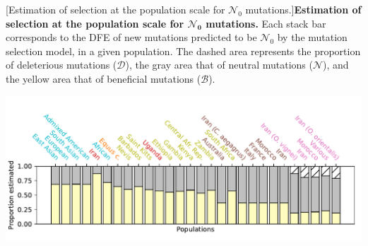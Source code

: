 \documentclass{article}
\newcommand{\SphyNeu}{\mathcal{N}_0}
\newcommand{\SpopDel}{\mathcal{D}}
\newcommand{\SpopNeu}{\mathcal{N}}
\newcommand{\SpopBen}{\mathcal{B}}
\begin{document}
\begin{center}
\begin{minipage}{0.75\linewidth}
\begin{minipage}{0.09\linewidth}
            \end{minipage}
        \end{minipage}
    [Estimation of selection at the population scale for $\SphyNeu$ mutations.]{\textbf{Estimation of selection at the population scale for $\bm{\SphyNeu}$ mutations.} Each stack bar corresponds to the DFE of new mutations predicted to be $\SphyNeu$ by the mutation selection model, in a given population. The dashed area represents the proportion of deleterious mutations ($\SpopDel$), the gray area that of neutral mutations ($\SpopNeu$), and the yellow area that of beneficial mutations ($\SpopBen$).\label{fig:pop-weak}}
    \end{center}


    \begin{center}
        \begin{minipage}{0.75\linewidth}
            \begin{minipage}{0.9\linewidth}
                \includegraphics[width=\linewidth, page=1]{artworks/Theta.pos.stacked.pdf}
            \end{minipage}
            \begin{minipage}{0.09\linewidth}

\end{minipage}
\end{minipage}
\end{center}
\end{document}

